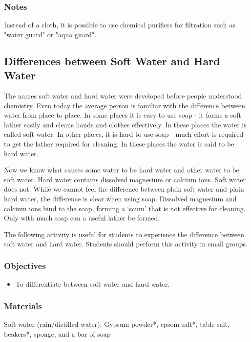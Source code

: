 \subsubsection*{Notes}
Instead of a cloth, it is possible to use chemical purifiers for filtration such as "water guard" or "aqua guard".

\subsection{Differences between Soft Water and Hard Water}

The names soft water and hard water were developed before people understood chemistry. Even today the average person is familiar with the difference between water from place to place. In some places it is easy to use soap - it forms a soft lather easily and cleans hands and clothes effectively. In these places the water is called soft water. In other places, it is hard to use soap - much effort is required to get the lather required for cleaning. In these places the water is said to be hard water.

Now we know what causes some water to be hard water and other water to be soft water. Hard water contains dissolved magnesium or calcium ions. Soft water does not. While we cannot feel the difference between plain soft water and plain hard water, the difference is clear when using soap. Dissolved magnesium and calcium ions bind to the soap, forming a `scum' that is not effective for cleaning. Only with much soap can a useful lather be formed.

The following activity is useful for students to experience the difference between soft water and hard water. Students should perform this activity in small groups.

\subsubsection*{Objectives}
\begin{itemize}
\item{To differentiate between soft water and hard water.}
\end{itemize}

\subsubsection*{Materials}
Soft water (rain/distilled water), Gypsum powder*, epsom salt*, table salt, beakers*, sponge, and a bar of soap

